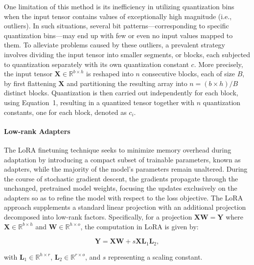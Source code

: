 One limitation of this method is its inefficiency in utilizing quantization bins when the input tensor contains values of exceptionally high magnitude (i.e., outliers). In such situations, several bit patterns—corresponding to specific quantization bins—may end up with few or even no input values mapped to them. To alleviate problems caused by these outliers, a prevalent strategy involves dividing the input tensor into smaller segments, or blocks, each subjected to quantization separately with its own quantization constant $c$. More precisely, the input tensor $\mathbf{X}\in \mathbb{R}^{b\times h}$ is reshaped into $n$ consecutive blocks, each of size $B$, by first flattening $\mathbf{X}$ and partitioning the resulting array into ${n = ({b\times h} )/{B} }$ distinct blocks. Quantization is then carried out independently for each block, using Equation~1, resulting in a quantized tensor together with $n$ quantization constants, one for each block, denoted as $c_i$.

\paragraph{Low-rank Adapters} The LoRA finetuning technique \citep{hu2021lora} seeks to minimize memory overhead during adaptation by introducing a compact subset of trainable parameters, known as adapters, while the majority of the model’s parameters remain unaltered. During the course of stochastic gradient descent, the gradients propagate through the unchanged, pretrained model weights, focusing the updates exclusively on the adapters so as to refine the model with respect to the loss objective. The LoRA approach supplements a standard linear projection with an additional projection decomposed into low-rank factors. Specifically, for a projection ${\mathbf{X} \mathbf{W} = \mathbf{Y}}$ where $\mathbf{X}\in  \mathbb{R}^{b\times h}$ and $\mathbf{W}\in  \mathbb{R}^{h\times o}$, the computation in LoRA is given by:

\begin{equation}
    \mathbf{Y} = \mathbf{X}\mathbf{W} + s\mathbf{X}\mathbf{L}_1\mathbf{L}_2,
\end{equation}

with $\mathbf{L}_1\in  \mathbb{R}^{h\times r}$, $\mathbf{L}_2\in  \mathbb{R}^{r\times o}$, and $s$ representing a scaling constant.

